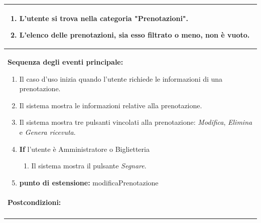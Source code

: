 \documentclass{article}
\begin{document}
\begin{table}[H]
\begin{tabular}{|p{\linewidth}|}
                        \cellcolor{gray!20}
                        \begin{minipage}{\linewidth}
                            \begin{enumerate}
                                \item L'utente si trova nella categoria "Prenotazioni". %
                                \item L'elenco delle prenotazioni, sia esso filtrato o meno, non è vuoto.
                            \end{enumerate}
                        \end{minipage}
                        \vspace{-5pt} \\
                        \hline
                        \textbf{Sequenza degli eventi principale:}
                        \begin{enumerate}
                            \item Il caso d'uso inizia quando l'utente richiede le informazioni di una prenotazione.
                            \item Il sistema mostra le informazioni relative alla prenotazione.
                            \item Il sistema mostra tre pulsanti vincolati alla prenotazione: \emph{Modifica}, \emph{Elimina} e \emph{Genera ricevuta}.
                            \item \textbf{If} l'utente è Amministratore o Biglietteria
                            \begin{enumerate}
                                \item Il sistema mostra il pulsante \emph{Segnare}.
                            \end{enumerate}
                            \item[] \textbf{punto di estensione:} modificaPrenotazione
                        \end{enumerate} \\
                        \hline
                        \cellcolor{gray!20}
                        \textbf{Postcondizioni:} \\
                        \cellcolor{gray!20}
                        \begin{minipage}{\linewidth}
                            \begin{enumerate}

\end{enumerate}
\end{minipage}
\end{tabular}
\end{table}
\end{document}
